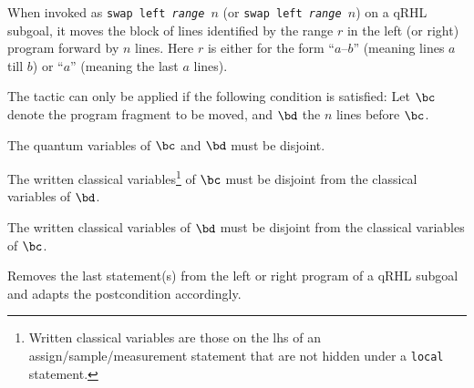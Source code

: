 \documentclass{article}
\begin{document}

When invoked as \texttt{swap left \textit{range} $n$} (or \texttt{swap
  left \textit{range} $n$}) on a qRHL subgoal, it moves the block of
lines identified by the range $r$ in the left (or right) program
forward by $n$ lines. Here $r$ is either for the form ``$a$--$b$''
(meaning lines $a$ till $b$) or ``$a$'' (meaning the last $a$ lines).

The tactic can only be applied if the following condition is
satisfied: Let $\bc$ denote the program fragment to be moved, and
$\bd$ the $n$ lines before $\bc$.
\begin{compactitem}
\item The quantum variables of $\bc$ and $\bd$ must be disjoint.
\item The written classical variables\footnote{Written classical variables
    are those on the lhs of an assign/sample/measurement statement
    that are not hidden under a \texttt{local} statement.}
  of $\bc$ must be disjoint from the classical variables of $\bd$.
\item The written classical variables of $\bd$ must be disjoint from the classical variables of $\bc$.
\end{compactitem}


Removes the last statement(s) from the left or right program of a qRHL
subgoal and adapts the postcondition accordingly.

\newcommand\WP{\operatorname{wp}}%
\end{document}
